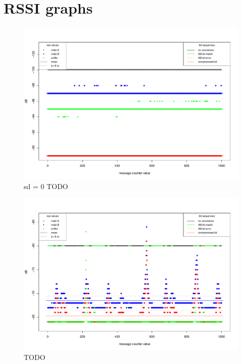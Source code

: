 \documentclass[
  print, %
  Table,   %
  nolof,     %
  nolot,     %
           oneside
]{fithesis3}
\begin{document}
\chapter{RSSI graphs}
\begin{figure}[h!!!]
  \includegraphics[height=0.9\textwidth, angle = 90 ]{../images/graph_rssi_01.pdf}
\caption{sd = 0 TODO}
\label{fig:rssi_01}
\end{figure}

\begin{figure}
  \includegraphics[height=\textwidth, angle = 90 ]{../images/graph_rssi_02.pdf}
\caption{TODO}
\label{fig:rssi_02}
\end{figure}
\end{document}
